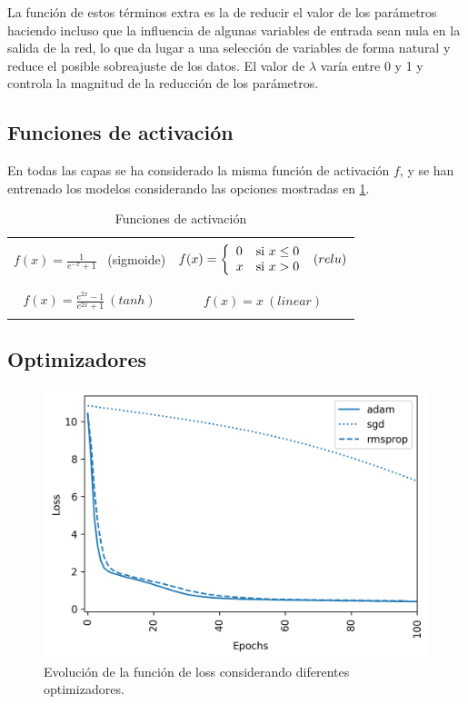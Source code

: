 La función de estos términos extra es la de reducir el valor de los parámetros haciendo incluso que la influencia de 
algunas variables de entrada sean nula en la salida de la red, lo que da lugar a una selección de variables de forma natural y
reduce el posible sobreajuste de los datos. El valor de $\lambda$ varía entre 0 y 1 y controla la magnitud
de la reducción de los parámetros. 

\subsection{Funciones de activación}
En todas las capas se ha considerado la misma función de activación $f$, y se han entrenado los modelos considerando 
las opciones mostradas en \ref{activation}.

\begin{table}[h!]
    \centering
    \begin{tabular}{|c|c|}   
        \hline
        &\\
     $ f(x)= \frac{1}{e^{-x}+1}$ ~(sigmoide) & 
     $f(x) = \left\lbrace
     \begin{array}{ll}
     0 &\textup{si } x\leq 0 \\
     x & \textup{si } x > 0 
     \end{array}
     \right. ~(relu)$    \\
     &\\
     \hline
     &\\
     $f(x)= \frac{e^{2x}-1}{e^{2x}+1} ~(tanh)$ & $f(x)=x ~ (linear)$    \\ 
     &\\
     \hline
    \end{tabular}
    \caption{ Funciones de activación}
    \label{activation}
    \end{table}


\subsection{Optimizadores}

\begin{figure}[h!]
  \begin{center}
    \includegraphics[height=3.in]{Figures/optims.png}
    \caption{ Evolución de la función de loss considerando diferentes optimizadores.}
    \label{opt}
  \end{center}
\end{figure}

